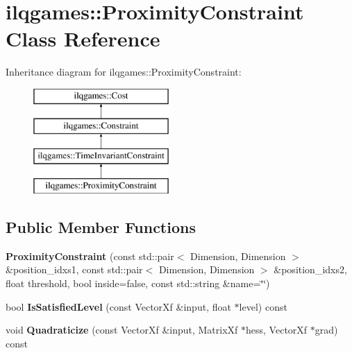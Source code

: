 \hypertarget{classilqgames_1_1_proximity_constraint}{}\section{ilqgames\+:\+:Proximity\+Constraint Class Reference}
\label{classilqgames_1_1_proximity_constraint}
Inheritance diagram for ilqgames\+:\+:Proximity\+Constraint\+:\begin{figure}[H]
\begin{center}
\leavevmode
\includegraphics[height=4.000000cm]{classilqgames_1_1_proximity_constraint}
\end{center}
\end{figure}
\subsection*{Public Member Functions}
\begin{DoxyCompactItemize}
\item 
{\bfseries Proximity\+Constraint} (const std\+::pair$<$ Dimension, Dimension $>$ \&position\+\_\+idxs1, const std\+::pair$<$ Dimension, Dimension $>$ \&position\+\_\+idxs2, float threshold, bool inside=false, const std\+::string \&name=\char`\"{}\char`\"{})\hypertarget{classilqgames_1_1_proximity_constraint_a71159362756836048f230751764f1caa}{}\label{classilqgames_1_1_proximity_constraint_a71159362756836048f230751764f1caa}

\item 
bool {\bfseries Is\+Satisfied\+Level} (const Vector\+Xf \&input, float $\ast$level) const \hypertarget{classilqgames_1_1_proximity_constraint_aee644bf94f80bdb20b849828e428a062}{}\label{classilqgames_1_1_proximity_constraint_aee644bf94f80bdb20b849828e428a062}

\item 
void {\bfseries Quadraticize} (const Vector\+Xf \&input, Matrix\+Xf $\ast$hess, Vector\+Xf $\ast$grad) const \hypertarget{classilqgames_1_1_proximity_constraint_a8b9e59164c2be71572124872af9b7b79}{}\label{classilqgames_1_1_proximity_constraint_a8b9e59164c2be71572124872af9b7b79}

\end{DoxyCompactItemize}
